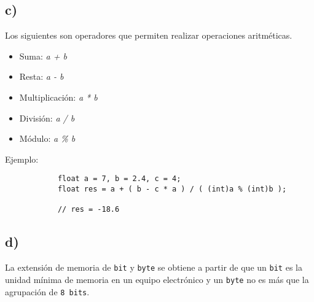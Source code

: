 \documentclass[10pt]{article}
\begin{document}
        \subsection*{c)}
        Los siguientes son operadores que permiten realizar operaciones aritméticas.
        \begin{itemize}
            \item Suma: \textit{a + b}
            \item Resta: \textit{a - b}
            \item Multiplicación: \textit{a * b}
            \item División: \textit{a / b}
            \item Módulo: \textit{a \% b}
        \end{itemize}
        Ejemplo: 
        \begin{verbatim}
            float a = 7, b = 2.4, c = 4;
            float res = a + ( b - c * a ) / ( (int)a % (int)b );
            
            // res = -18.6
        \end{verbatim}


        \subsection*{d)}
        La extensión de memoria de \texttt{bit} y \texttt{byte} se obtiene a partir de que un \texttt{bit} es la unidad mínima de memoria en un equipo electrónico y un \texttt{byte} no es más que la agrupación de \texttt{8 bits}.
        
\end{document}
